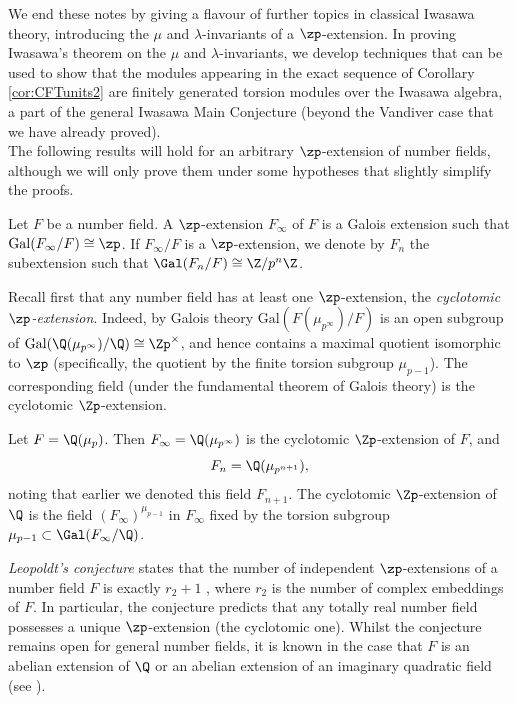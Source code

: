 \documentclass[a4paper,10pt, english, reqno]{smfart}
\numberwithin{equation}{section}
\begin{document}
We end these notes by giving a flavour of further topics in classical Iwasawa theory, introducing the $\mu$ and $\lambda$-invariants of a $\zp$-extension. In proving Iwasawa's theorem on the $\mu$ and $\lambda$-invariants, we develop techniques that can be used to show that the modules appearing in the exact sequence of Corollary \ref{cor:CFTunits2} are finitely generated torsion modules over the Iwasawa algebra, a part of the general Iwasawa Main Conjecture (beyond the Vandiver case that we have already proved). \\

The following results will hold for an arbitrary $\zp$-extension of number fields, although we will only prove them under some hypotheses that slightly simplify the proofs. 

\begin{definition}
Let $F$ be a number field. A $\zp$-extension $F_\infty$ of $F$ is a Galois extension such that $\mathrm{Gal}(F_\infty / F) \cong \zp$. If $F_\infty / F$ is a $\zp$-extension, we denote by $F_n$ the subextension such that $\Gal(F_n/F) \cong \Z/p^n\Z$.
\end{definition}

Recall first that any number field has at least one $\zp$-extension, the \emph{cyclotomic $\zp$-extension}. Indeed, by Galois theory $\mathrm{Gal}(F(\mu_{p^\infty}) / F)$ is an open subgroup of $\mathrm{Gal}(\Q(\mu_{p^\infty}) / \Q) \cong \Zp^\times$, and hence contains a maximal quotient isomorphic to $\zp$ (specifically, the quotient by the finite torsion subgroup $\mu_{p-1}$). The corresponding field (under the fundamental theorem of Galois theory) is the cyclotomic $\Zp$-extension.
\begin{example}
Let $F = \Q(\mu_p)$. Then $F_\infty = \Q(\mu_{p^\infty})$ is the cyclotomic $\Zp$-extension of $F$, and 
\[F_n = \Q(\mu_{p^{n+1}}),\]
noting that earlier we denoted this field $F_{n+1}$. The cyclotomic $\Zp$-extension of $\Q$ is the field $(F_\infty)^{\mu_{p-1}}$ in $F_\infty$ fixed by the torsion subgroup $\mu_{p-1} \subset \Gal(F_\infty/\Q)$.
\end{example}

\emph{Leopoldt's conjecture} states that the number of independent $\zp$-extensions of a number field $F$ is exactly $r_2 + 1$ , where $r_2$ is the number of complex embeddings of $F$. In particular, the conjecture predicts that any totally real number field possesses a unique $\zp$-extension (the cyclotomic one). Whilst the conjecture remains open for general number fields, it is known in the case that $F$ is an abelian extension of $\Q$ or an abelian extension of an imaginary quadratic field (see \cite[Theorem 10.3.16]{NSW99}).
\end{document}
